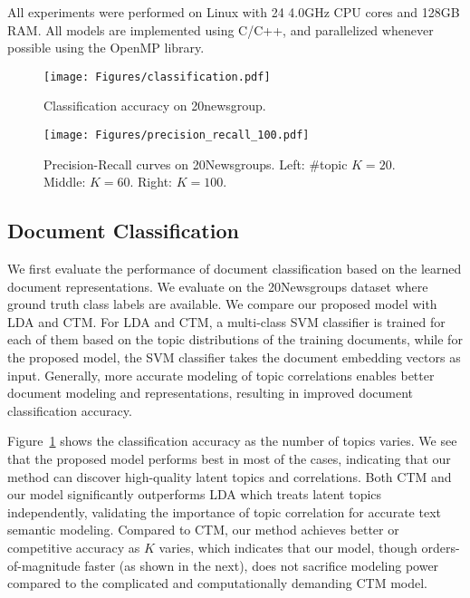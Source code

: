 \documentclass[sigconf]{acmart}
\begin{document}
All experiments were performed on Linux with 24 4.0GHz CPU cores and 128GB RAM. All models are implemented using C/C++, and parallelized whenever possible using the OpenMP library. 

\begin{figure}[!t]
\begin{center}
\texttt{[image: Figures/classification.pdf]}
\vspace{-15pt}
\caption{Classification accuracy on 20newsgroup.}
\label{fig:cls-20news}
\end{center}
\vspace{-10pt}
\end{figure}

\begin{figure*}[!t]
\begin{center}
\hfil
{}
\hfil
\subfigure
{\texttt{[image: Figures/precision\_recall\_100.pdf]}
}
\vspace{-13pt}
\caption{Precision-Recall curves on 20Newsgroups. Left: \#topic $K=20$. Middle: $K=60$. Right: $K=100$.}
\label{fig:doc-ir}
\end{center}
\vspace{-3pt}
\end{figure*}

\subsection{Document Classification} \label{sec:cls}
We first evaluate the performance of document classification based on the learned document representations. We evaluate on the 20Newsgroups dataset where ground truth class labels are available. We compare our proposed model with LDA and CTM. For LDA and CTM, a multi-class SVM classifier is trained for each of them based on the topic distributions of the training documents, while for the proposed model, the SVM classifier takes the document embedding vectors as input. Generally, more accurate modeling of topic correlations enables better document modeling and representations, resulting in improved document classification accuracy.

Figure~\ref{fig:cls-20news} shows the classification accuracy as the number of topics varies. We see that the proposed model performs best in most of the cases, indicating that our method can discover high-quality latent topics and correlations. Both CTM and our model significantly outperforms LDA which treats latent topics independently, validating the importance of topic correlation for accurate text semantic modeling. Compared to CTM, our method achieves better or competitive accuracy as $K$ varies, which indicates that our model, though orders-of-magnitude faster (as shown in the next), does not sacrifice modeling power compared to the complicated and computationally demanding CTM model.
\end{document}
